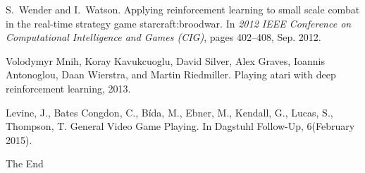 \documentclass{beamer}
\begin{document}
\begin{frame}[allowframebreaks]
{\begin{thebibliography}{99}
    S.~{Wender} and I.~{Watson}.
    \newblock Applying reinforcement learning to small scale combat in the real-time strategy game starcraft:broodwar.
    \newblock In {\em 2012 IEEE Conference on Computational Intelligence and Games (CIG)}, pages 402--408, Sep. 2012.

    Volodymyr Mnih, Koray Kavukcuoglu, David Silver, Alex Graves, Ioannis Antonoglou, Daan Wierstra, and Martin Riedmiller.
    \newblock Playing atari with deep reinforcement learning, 2013.

    Levine, J., Bates Congdon, C., Bída, M., Ebner, M., Kendall, G., Lucas, S., Thompson, T.
    \newblock General Video Game Playing. 
    \newblock In Dagstuhl Follow-Up, 6(February 2015).

    \end{thebibliography}
}
\end{frame}


\begin{frame}
\Huge{\centerline{The End}}
\end{frame}

\end{document}
